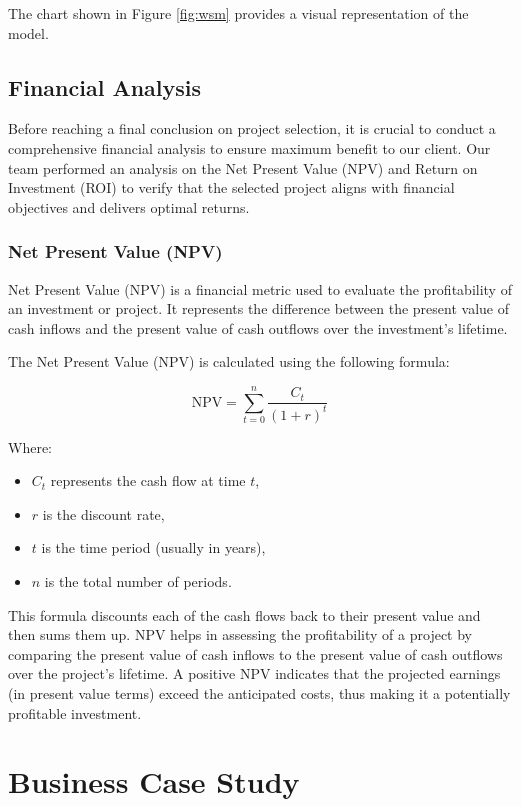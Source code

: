 The chart shown in Figure \ref{fig:wsm} provides a visual representation of the model.

\subsection{Financial Analysis}

Before reaching a final conclusion on project selection, it is crucial to conduct a comprehensive financial analysis to ensure maximum benefit to our client. Our team performed an analysis on the Net Present Value (NPV) and Return on Investment (ROI) to verify that the selected project aligns with financial objectives and delivers optimal returns.

\subsubsection*{Net Present Value (NPV)}

Net Present Value (NPV) is a financial metric used to evaluate the profitability of an investment or project. It represents the difference between the present value of cash inflows and the present value of cash outflows over the investment's lifetime.

The Net Present Value (NPV) is calculated using the following formula:

\[
\text{NPV} = \sum_{t=0}^{n} \frac{C_t}{(1 + r)^t}
\]

Where:
\begin{itemize}
    \item \( C_t \) represents the cash flow at time \( t \),
    \item \( r \) is the discount rate,
    \item \( t \) is the time period (usually in years),
    \item \( n \) is the total number of periods.
\end{itemize}

This formula discounts each of the cash flows back to their present value and then sums them up. NPV helps in assessing the profitability of a project by comparing the present value of cash inflows to the present value of cash outflows over the project's lifetime. A positive NPV indicates that the projected earnings (in present value terms) exceed the anticipated costs, thus making it a potentially profitable investment.



\section{Business Case Study}


